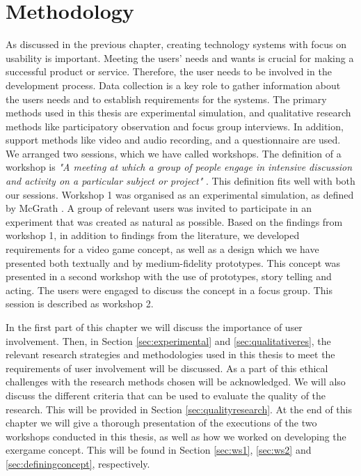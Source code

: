 \chapter{Methodology}
\label{chap:metode}
As discussed in the previous chapter, creating technology systems with focus on usability is important. Meeting the users' needs and wants is crucial for making a successful product or service. Therefore, the user needs to be involved in the development process. Data collection is a key role to gather information about the users needs and to establish requirements for the systems. The primary methods used in this thesis are experimental simulation, and qualitative research methods like participatory observation and focus group interviews. In addition, support methods like video and audio recording, and a questionnaire are used. We arranged two sessions, which we have called workshops. The definition of a workshop is \emph{"A meeting at which a group of people engage in intensive discussion and activity on a particular subject or project"} \cite{dictionary}. This definition fits well with both our sessions. Workshop 1 was organised as an experimental simulation, as defined by McGrath \cite{McGrath}. A group of relevant users was invited to participate in an experiment that was created as natural as possible. Based on the findings from workshop 1, in addition to findings from the literature, we developed requirements for a video game concept, as well as a design which we have presented both textually and by medium-fidelity prototypes. This concept was presented in a second workshop with the use of prototypes, story telling and acting. The users were engaged to discuss the concept in a focus group. This session is described as workshop 2.

In the first part of this chapter we will discuss the importance of user involvement. Then, in Section \ref{sec:experimental} and \ref{sec:qualitativeres}, the relevant research strategies and methodologies used in this thesis to meet the requirements of user involvement will be discussed. As a part of this ethical challenges with the research methods chosen will be acknowledged. We will also discuss the different criteria that can be used to evaluate the quality of the research. This will be provided in Section \ref{sec:qualityresearch}.  At the end of this chapter we will give a thorough presentation of the executions of the two workshops conducted in this thesis, as well as how we worked on developing the exergame concept.  This will be found in Section \ref{sec:ws1}, \ref{sec:ws2} and \ref{sec:definingconcept}, respectively. 

